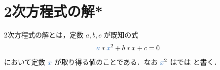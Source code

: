 \documentclass[a5paper,twoside,fleqn,draft]{jsbook}
\begin{document}

\section{2次方程式の解*}

2次方程式の解とは，定数 $a,b,c$ が既知の式
\begin{equation}
\hVar{a}*\hVar{x}^2+b*x+c=0
\end{equation}
において定数 $\hVar{x}$ が取り得る値のことである．なお $\hVar{x}^2$ は\haskell では
 と書く．
\end{document}
